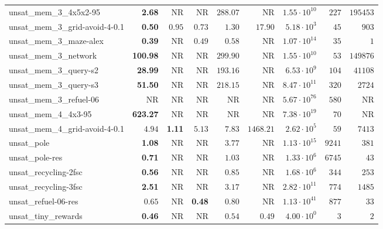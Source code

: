 \begin{tabular}{lrrrrrrrr}
unsat\_mem\_3\_4x5x2-95 & \textbf{2.68} & NR & NR & $288.07$ & NR & $1.55\cdot 10^{10}$ & $227$ & $195453$ \\
unsat\_mem\_3\_grid-avoid-4-0.1 & \textbf{0.50} & $0.95$ & $0.73$ & $1.30$ & $17.90$ & $5.18\cdot 10^{3}$ & $45$ & $903$ \\
unsat\_mem\_3\_maze-alex & \textbf{0.39} & NR & $0.49$ & $0.58$ & NR & $1.07\cdot 10^{14}$ & $35$ & $1$ \\
unsat\_mem\_3\_network & \textbf{100.98} & NR & NR & $299.90$ & NR & $1.55\cdot 10^{10}$ & $53$ & $149876$ \\
unsat\_mem\_3\_query-s2 & \textbf{28.99} & NR & NR & $193.16$ & NR & $6.53\cdot 10^{9}$ & $104$ & $41108$ \\
unsat\_mem\_3\_query-s3 & \textbf{51.50} & NR & NR & $218.15$ & NR & $8.47\cdot 10^{11}$ & $320$ & $2724$ \\
unsat\_mem\_3\_refuel-06 & NR & NR & NR & NR & NR & $5.67\cdot 10^{76}$ & $580$ & NR \\
unsat\_mem\_4\_4x3-95 & \textbf{623.27} & NR & NR & NR & NR & $7.38\cdot 10^{19}$ & $70$ & NR \\
unsat\_mem\_4\_grid-avoid-4-0.1 & $4.94$ & \textbf{1.11} & $5.13$ & $7.83$ & $1468.21$ & $2.62\cdot 10^{5}$ & $59$ & $7413$ \\
unsat\_pole & \textbf{1.08} & NR & NR & $3.77$ & NR & $1.13\cdot 10^{15}$ & $9241$ & $381$ \\
unsat\_pole-res & \textbf{0.71} & NR & NR & $1.03$ & NR & $1.33\cdot 10^{6}$ & $6745$ & $43$ \\
unsat\_recycling-2fsc & \textbf{0.56} & NR & NR & $0.85$ & NR & $1.68\cdot 10^{6}$ & $344$ & $253$ \\
unsat\_recycling-3fsc & \textbf{2.51} & NR & NR & $3.17$ & NR & $2.82\cdot 10^{11}$ & $774$ & $1485$ \\
unsat\_refuel-06-res & $0.65$ & NR & \textbf{0.48} & $0.80$ & NR & $1.13\cdot 10^{41}$ & $877$ & $33$ \\
unsat\_tiny\_rewards & \textbf{0.46} & NR & NR & $0.54$ & $0.49$ & $4.00\cdot 10^{0}$ & $3$ & $2$ \\
\bottomrule
\end{tabular}
